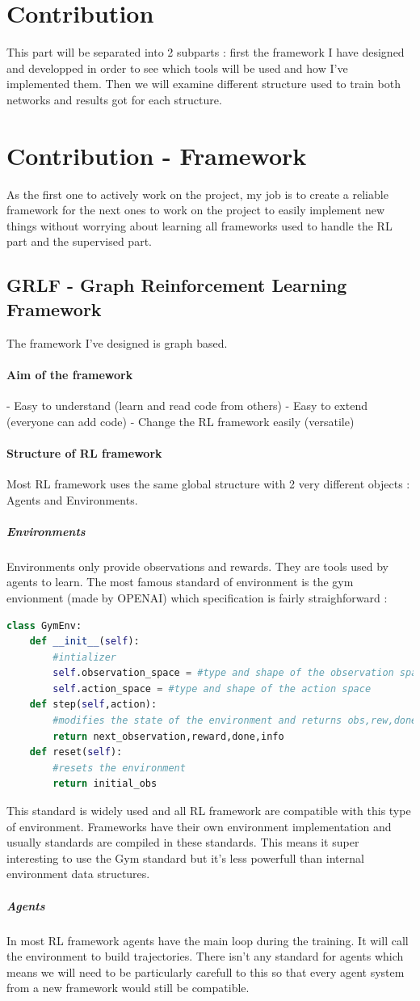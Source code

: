 \documentclass[11pt]{article}
\begin{document}
\section{Contribution}
This part will be separated into 2 subparts : first the framework I have designed and developped in order to see which tools will be used and how I've implemented them. Then we will examine different structure used to train both networks and results got for each structure.
\section{Contribution - Framework}
As the first one to actively work on the project, my job is to create a reliable framework for the next ones to work on the project to easily implement new things without worrying about learning all frameworks used to handle the RL part and the supervised part.
\subsection{GRLF - Graph Reinforcement Learning Framework}
The framework I've designed is graph based.
\paragraph{Aim of the framework}
- Easy to understand (learn and read code from others)
- Easy to extend (everyone can add code)
- Change the RL framework easily (versatile)
\paragraph{Structure of RL framework}
Most RL framework uses the same global structure with 2 very different objects : Agents and Environments.
\subparagraph{Environments}
Environments only provide observations and rewards. They are tools used by agents to learn. The most famous standard of environment is the gym envionment (made by OPENAI) which specification is fairly straighforward :
\begin{lstlisting}[language=Python]
class GymEnv:
	def __init__(self):
		#intializer
		self.observation_space = #type and shape of the observation space
		self.action_space = #type and shape of the action space
	def step(self,action):
		#modifies the state of the environment and returns obs,rew,done=(if the env needs to be reset),info=debug
		return next_observation,reward,done,info
	def reset(self):
		#resets the environment
		return initial_obs
\end{lstlisting}
This standard is widely used and all RL framework are compatible with this type of environment. Frameworks have their own environment implementation and usually standards are compiled in these standards. This means it super interesting to use the Gym standard but it's less powerfull than internal environment data structures.
\subparagraph{Agents}
In most RL framework agents have the main loop during the training. It will call the environment to build trajectories. There isn't any standard for agents which means we will need to be particularly carefull to this so that every agent system from a new framework would still be compatible.
\end{document}
